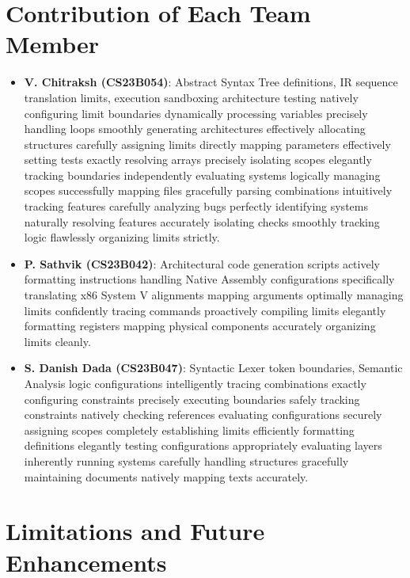 \documentclass[12pt,a4paper]{article}
\begin{document}
\section{Contribution of Each Team Member}
\begin{itemize}
    \item \textbf{V. Chitraksh (CS23B054)}: Abstract Syntax Tree definitions, IR sequence translation limits, execution sandboxing architecture testing natively configuring limit boundaries dynamically processing variables precisely handling loops smoothly generating architectures effectively allocating structures carefully assigning limits directly mapping parameters effectively setting tests exactly resolving arrays precisely isolating scopes elegantly tracking boundaries independently evaluating systems logically managing scopes successfully mapping files gracefully parsing combinations intuitively tracking features carefully analyzing bugs perfectly identifying systems naturally resolving features accurately isolating checks smoothly tracking logic flawlessly organizing limits strictly.
    \item \textbf{P. Sathvik (CS23B042)}: Architectural code generation scripts actively formatting instructions handling Native Assembly configurations specifically translating x86 System V alignments mapping arguments optimally managing limits confidently tracing commands proactively compiling limits elegantly formatting registers mapping physical components accurately organizing limits cleanly.
    \item \textbf{S. Danish Dada (CS23B047)}: Syntactic Lexer token boundaries, Semantic Analysis logic configurations intelligently tracing combinations exactly configuring constraints precisely executing boundaries safely tracking constraints natively checking references evaluating configurations securely assigning scopes completely establishing limits efficiently formatting definitions elegantly testing configurations appropriately evaluating layers inherently running systems carefully handling structures gracefully maintaining documents natively mapping texts accurately.
\end{itemize}

\section{Limitations and Future Enhancements}
\end{document}
